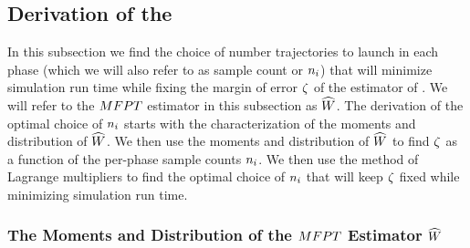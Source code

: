 %
%
%

\subsection{Derivation of the \opteq{}}
\label{sec:opteq_derivation}
In this subsection we find the choice of number trajectories to launch in each  phase (which we will also refer to as sample count or $n_{i}$) that will minimize simulation run time while fixing the margin of error $\zeta$ of the estimator of . We will refer to the $MFPT$ estimator in this subsection as $\widehat{W}$. The derivation of the optimal choice of $n_{i}$ starts with the characterization of the moments and distribution of $\widehat{W}$. We then use the moments and distribution of $\widehat{W}$ to find $\zeta$ as a function of the per-phase sample counts $n_{i}$. We then use the method of Lagrange multipliers to find the optimal choice of $n_{i}$ that will keep $\zeta$ fixed while minimizing simulation run time.


\subsubsection{The Moments and Distribution of the  $MFPT$ Estimator $\widehat{W}$}
\label{sec:phase_weight_moments}


